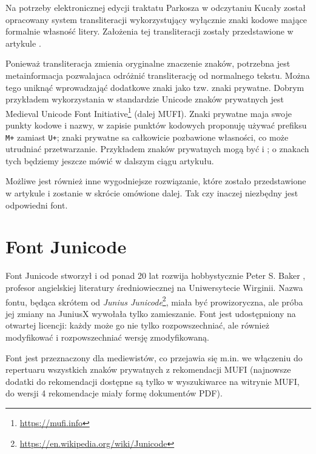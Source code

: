  Na potrzeby elektronicznej edycji traktatu Parkosza w odczytaniu
  Kucały \autocite*{kucała20:_trakt_jakub_parkos} został opracowany
  system transliteracji wykorzystujący wyłącznie znaki kodowe mające
  formalnie własność litery. Założenia tej transliteracji zostały
  przedstawione w artykule \autocite{bien_parkoszPSP}. 

  Ponieważ transliteracja zmienia oryginalne znaczenie znaków,
  potrzebna jest metainformacja pozwalajaca odróżnić transliterację od
  normalnego tekstu. Można tego uniknąć wprowadzająć dodatkowe znaki
  jako tzw. znaki prywatne. Dobrym przykładem wykorzystania w
  standardzie Unicode znaków prywatnych jest Medieval Unicode Font
  Initiative\footnote{\url{https://mufi.info}} (dalej MUFI). Znaki
  prywatne maja swoje punkty kodowe i nazwy, w zapisie punktów
  kodowych proponuję używać prefiksu \texttt{M+} zamiast \texttt{U+};
  znaki prywatne sa całkowicie pozbawione własności, co może utrudniać
  przetwarzanie. Przykładem znaków prywatnych mogą być 
    i
    ; o znakach tych będziemy jeszcze mówić w dalszym ciągu
  artykułu.

  Możliwe jest również inne wygodniejsze rozwiązanie, które zostało
  przedstawione w artykule \autocite{bien_representing_2022} i
  zostanie w skrócie omówione dalej. Tak czy inaczej niezbędny jest
  odpowiedni font.
  


\section{Font Junicode}
\label{sec:font-junicode}

Font Junicode stworzył i od ponad 20 lat rozwija hobbystycznie Peter S. Baker
\autocite*{baker22:Junicode}, profesor angielskiej literatury
średniowiecznej na Uniwersytecie Wirginii. Nazwa fontu, będąca skrótem
od \textit{Junius
  Junicode}\footnote{\url{https://en.wikipedia.org/wiki/Junicode}},
miała być prowizoryczna, ale próba jej zmiany na JuniusX wywołała
tylko zamieszanie. Font jest udostępniony na otwartej licencji: każdy
może go nie tylko rozpowszechniać, ale również modyfikować i
rozpowszechniać wersję zmodyfikowaną.

Font jest przeznaczony dla mediewistów, co przejawia się m.in. we
włączeniu do repertuaru wszystkich znaków prywatnych z rekomendacji
MUFI (najnowsze dodatki do rekomendacji dostępne są tylko w
wyszukiwarce na witrynie MUFI, do wersji 4 rekomendacje miały formę
dokumentów PDF).

